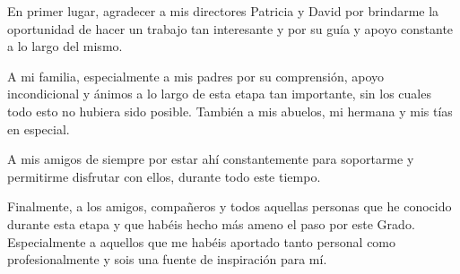 \documentclass[11pt,a4paper,titlepage,oneside]{report}
\begin{document}

 
 \paxinaenbranco
 \begin{agradecementos}
 En primer lugar, agradecer a mis directores Patricia y David por brindarme la oportunidad de hacer un trabajo tan interesante y por su guía y apoyo constante a lo largo del mismo.

 A mi familia, especialmente a mis padres por su comprensión, apoyo incondicional y ánimos a lo largo de esta etapa tan importante, sin los cuales todo esto no hubiera sido posible. También a mis abuelos, mi hermana y mis tías en especial.

 A mis amigos de siempre por estar ahí constantemente para soportarme y permitirme disfrutar con ellos, durante todo este tiempo. 
 
 Finalmente, a los amigos, compañeros y todos aquellas personas que he conocido durante esta etapa y que habéis hecho más ameno el paso por este Grado. Especialmente a aquellos que me habéis aportado tanto personal como profesionalmente y sois una fuente de inspiración para mí. 
 \end{agradecementos}
 

 \setcounter{page}{1}

 \tableofcontents
 \listoffigures
 \listoftables
 \clearpage
 \setlength\arrayrulewidth{0.75pt} %

 \setcounter{page}{1}


 
 
 
 
 
 
 
 
 
 

  \appendix
%

 \printglossary[type=\acronymtype,title=\nomeglosarioacronimos]
 \printglossary[title=\nomeglosariotermos]

 
 
 \clearpage
 
\end{document}
